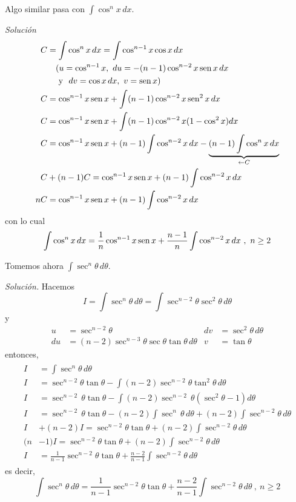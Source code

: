 \begin{ejemplo}
Algo similar pasa con $\int \cos^{n}x\,dx$.
\end{ejemplo}
\emph{Solución}
\begin{gather*}
\begin{aligned}
  C&=\int \cos ^{n}x\,dx=\int \cos ^{n-1}x\cos x\,dx\\
  & \quad (u=\cos ^{n-1}x,\ du=-(n-1)\cos^{n-2}x\operatorname{sen} x\,dx\\
  & \quad \text{ y }\ dv=\cos x\, dx,\ v=\operatorname{sen} x)\\
  C&=\cos ^{n-1}x\operatorname{sen} x+\int (n-1)\cos ^{n-2}x\operatorname{sen} ^{2}x\,dx\\
  C&=\cos ^{n-1}x\operatorname{sen} x+\int (n-1)\cos ^{n-2}x(1-\cos ^{2}x)dx\\
  C&=\cos ^{n-1}x\operatorname{sen} x+(n-1)\int \cos ^{n-2}x\,dx-\underbrace{(n-1)\int \cos ^{n}x\,dx}_{\leftarrow C}\\
  C&+(n-1)C=\cos ^{n-1}x\operatorname{sen} x+(n-1)\int \cos ^{n-2}x\,dx\\
  nC&=\cos ^{n-1}x\operatorname{sen} x+(n-1)\int \cos ^{n-2}x\,dx
\end{aligned}
\end{gather*}
con lo cual
\begin{equation}\label{PotCoseno}
\int \cos^{n}x\,dx=\frac{1}{n}\cos ^{n-1}x\operatorname{sen} x +\frac{n-1}{n}\int \cos ^{n-2}x\,dx\ ,\ n\geq 2
\end{equation}

\begin{ejemplo}
Tomemos ahora $\int \sec ^{n}\theta\,d\theta$.
\end{ejemplo}
\emph{Solución.}
Hacemos
\[
I=\int \sec ^{n}\theta\,d\theta=\int \sec ^{n-2}\theta \sec ^{2}\theta\,d\theta
\]
y
\begin{align*}
u&=\sec ^{n-2}\theta & dv&=\sec ^{2}\theta\,d\theta \\
du&=(n-2)\sec ^{n-3}\theta \sec \theta \tan \theta\,d\theta & v&=\tan \theta
\end{align*}
entonces,
\begin{gather*}
\begin{aligned}
  I&=\int \sec ^{n}\theta\,d\theta\\
  I&=\sec ^{n-2}\theta \tan \theta -\int (n-2)\sec ^{n-2}\theta \tan^{2}\theta\,d\theta\\
  I&=\sec ^{n-2\ }\theta \tan \theta -\int (n-2)\sec ^{n-2\ }\theta (\sec
  ^{2}\theta -1)d\theta \\
  I&=\sec ^{n-2\ }\theta \tan \theta -(n-2)\int \sec ^{n\ }\theta\,d\theta
  +(n-2)\int \sec ^{n-2}\theta\,d\theta \\
  I&+(n-2)I=\sec ^{n-2}\theta \tan \theta +(n-2)\int \sec ^{n-2}\theta\,d\theta\\
  (n&-1)I=\sec ^{n-2}\theta \tan \theta +(n-2)\int \sec ^{n-2}\theta\,d\theta\\
  I&=\frac{1}{n-1}\sec ^{n-2}\theta \tan \theta +\frac{n-2%
  }{n-1}\int \sec ^{n-2}\theta\,d\theta
\end{aligned}
\end{gather*}
es decir,
\[
\int \sec ^{n}\theta\,d\theta =\frac{1}{n-1}\sec ^{n-2}\theta \tan \theta +%
\frac{n-2}{n-1}\int \sec ^{n-2}\theta\,d\theta\ ,\ n\geq 2
\]

